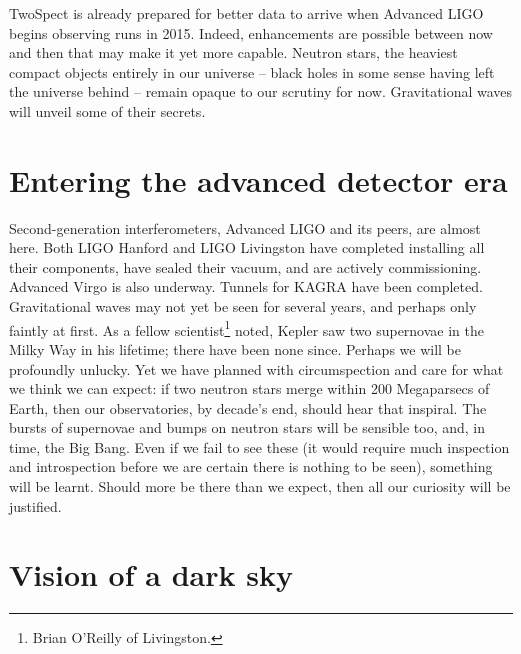 TwoSpect is already prepared for better data to arrive when Advanced LIGO begins observing runs in 2015.
Indeed, enhancements are possible between now and then that may make it yet more capable.
Neutron stars, the heaviest compact objects entirely in our universe -- black holes in some sense having left the universe behind -- remain opaque to our scrutiny for now.
Gravitational waves will unveil some of their secrets.

    \section{Entering the advanced detector era}
    \label{advanced_detector_era}


Second-generation interferometers, Advanced LIGO and its peers, are almost here. 
Both LIGO Hanford and LIGO Livingston have completed installing all their components, have sealed their vacuum, and are actively commissioning.
Advanced Virgo is also underway.
Tunnels for KAGRA have been completed.
Gravitational waves may not yet be seen for several years, and perhaps only faintly at first.
As a fellow scientist\footnote{Brian O'Reilly of Livingston.} noted, Kepler saw two supernovae in the Milky Way in his lifetime; there have been none since.
Perhaps we will be profoundly unlucky.
Yet we have planned with circumspection and care for what we think we can expect: if two neutron stars merge within 200 Megaparsecs of Earth, then our observatories, by decade's end, should hear that inspiral.
The bursts of supernovae and bumps on neutron stars will be sensible too, and, in time, the Big Bang.
Even if we fail to see these (it would require much inspection and introspection before we are certain there is nothing to be seen), something will be learnt.
Should more be there than we expect, then all our curiosity will be justified.

    \section{Vision of a dark sky}
    \label{dark_sky}

